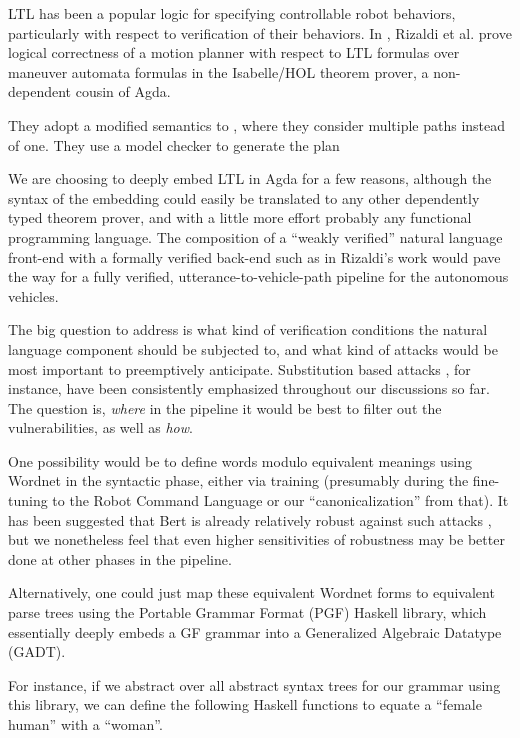 \documentclass{article}
\begin{document}
LTL has been a popular logic for specifying controllable robot behaviors,
particularly with respect to verification of their behaviors. In
\cite{verifiedMotion}, Rizaldi et al. prove logical correctness of a motion
planner with respect to LTL formulas over maneuver automata formulas in the
Isabelle/HOL theorem prover, a non-dependent cousin of Agda.

They adopt a
modified semantics to \cite{fainekos2005temporal}, where they consider multiple
paths instead of one. They use a model checker to generate the plan

We are choosing to
deeply embed LTL in Agda for a few reasons, although the syntax of the embedding
could easily be translated to any other dependently typed theorem prover, and
with a little more effort probably any functional programming language. The
composition of a ``weakly verified'' natural language front-end with a formally
verified back-end such as in Rizaldi's work would pave the way for a fully
verified, utterance-to-vehicle-path pipeline for the autonomous vehicles.

The big question to address is what kind of verification conditions the natural
language component should be subjected to, and what kind of attacks would be
most important to preemptively anticipate. Substitution based attacks
\cite{substAttacks}, for instance, have been consistently emphasized throughout
our discussions so far. The question is, \emph{where} in the pipeline it would
be best to filter out the vulnerabilities, as well as \emph{how}.

One possibility would be to define words modulo equivalent meanings using
Wordnet \cite{wordnet} in the syntactic phase, either via training
\cite{ren-etal-2019-generating} (presumably during the fine-tuning to the Robot
Command Language or our ``canonicalization'' from that). It has been suggested
that Bert is already relatively robust against such attacks
\cite{hauser2021bert}, but we nonetheless feel that even higher sensitivities of
robustness may be better done at other phases in the pipeline.

Alternatively, one could just map these equivalent Wordnet forms to equivalent
parse trees using the Portable Grammar Format (PGF) Haskell library, which
essentially deeply embeds a GF grammar into a Generalized Algebraic Datatype
(GADT).

For instance, if we abstract over all abstract syntax trees for our grammar
using this library, we can define the following Haskell functions to equate a
``female human'' with a ``woman''.
\end{document}
